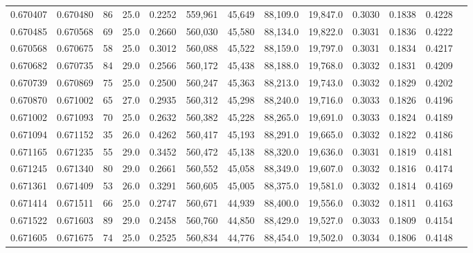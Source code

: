 \begin{tabular}{rrrrrrrrrrrrr}
0.670407 & 0.670480 &    86 & 25.0 &                                     0.2252 & 559,961 &  45,649 &  88,109.0 &  19,847.0 & 0.3030 & 0.1838 & 0.4228 \\
0.670485 & 0.670568 &    69 & 25.0 &                                     0.2660 & 560,030 &  45,580 &  88,134.0 &  19,822.0 & 0.3031 & 0.1836 & 0.4222 \\
0.670568 & 0.670675 &    58 & 25.0 &                                     0.3012 & 560,088 &  45,522 &  88,159.0 &  19,797.0 & 0.3031 & 0.1834 & 0.4217 \\
0.670682 & 0.670735 &    84 & 29.0 &                                     0.2566 & 560,172 &  45,438 &  88,188.0 &  19,768.0 & 0.3032 & 0.1831 & 0.4209 \\
0.670739 & 0.670869 &    75 & 25.0 &                                     0.2500 & 560,247 &  45,363 &  88,213.0 &  19,743.0 & 0.3032 & 0.1829 & 0.4202 \\
0.670870 & 0.671002 &    65 & 27.0 &                                     0.2935 & 560,312 &  45,298 &  88,240.0 &  19,716.0 & 0.3033 & 0.1826 & 0.4196 \\
0.671002 & 0.671093 &    70 & 25.0 &                                     0.2632 & 560,382 &  45,228 &  88,265.0 &  19,691.0 & 0.3033 & 0.1824 & 0.4189 \\
0.671094 & 0.671152 &    35 & 26.0 &                                     0.4262 & 560,417 &  45,193 &  88,291.0 &  19,665.0 & 0.3032 & 0.1822 & 0.4186 \\
0.671165 & 0.671235 &    55 & 29.0 &                                     0.3452 & 560,472 &  45,138 &  88,320.0 &  19,636.0 & 0.3031 & 0.1819 & 0.4181 \\
0.671245 & 0.671340 &    80 & 29.0 &                                     0.2661 & 560,552 &  45,058 &  88,349.0 &  19,607.0 & 0.3032 & 0.1816 & 0.4174 \\
0.671361 & 0.671409 &    53 & 26.0 &                                     0.3291 & 560,605 &  45,005 &  88,375.0 &  19,581.0 & 0.3032 & 0.1814 & 0.4169 \\
0.671414 & 0.671511 &    66 & 25.0 &                                     0.2747 & 560,671 &  44,939 &  88,400.0 &  19,556.0 & 0.3032 & 0.1811 & 0.4163 \\
0.671522 & 0.671603 &    89 & 29.0 &                                     0.2458 & 560,760 &  44,850 &  88,429.0 &  19,527.0 & 0.3033 & 0.1809 & 0.4154 \\
0.671605 & 0.671675 &    74 & 25.0 &                                     0.2525 & 560,834 &  44,776 &  88,454.0 &  19,502.0 & 0.3034 & 0.1806 & 0.4148 \\

\end{tabular}
